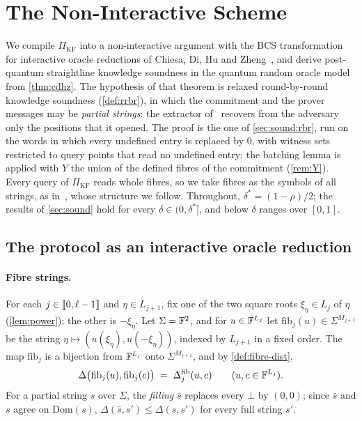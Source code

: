 \section{The Non-Interactive Scheme}\label{sec:pq}

We compile $\Pi_{\mathrm{KF}}$ into a non-interactive argument with the BCS transformation for interactive oracle reductions of Chiesa, Di, Hu and Zheng~\cite{CDHZ25}, and derive post-quantum straightline knowledge soundness in the quantum random oracle model from \cref{thm:cdhz}.
The hypothesis of that theorem is relaxed round-by-round knowledge soundness (\cref{def:rrbr}), in which the commitment and the prover messages may be \emph{partial strings}: the extractor of~\cite{CDHZ25} recovers from the adversary only the positions that it opened.
The proof is the one of \cref{sec:sound:rbr}, run on the words in which every undefined entry is replaced by $0$, with witness sets restricted to query points that read no undefined entry; the batching lemma is applied with $Y$ the union of the defined fibres of the commitment (\cref{rem:Y}).
Every query of $\Pi_{\mathrm{KF}}$ reads whole fibres, so we take fibres as the symbols of all strings, as in~\cite[\S7.7]{Mkh26}, whose structure we follow.
Throughout, $\delta^* = (1-\rho)/2$; the results of \cref{sec:sound} hold for every $\delta \in (0,\delta^*]$, and below $\delta$ ranges over $[0,1]$.

\subsection{The protocol as an interactive oracle reduction}\label{sec:pq:ior}

\paragraph{Fibre strings.}
For each $j \in \llbracket 0, \ell-1 \rrbracket$ and $\eta \in L_{j+1}$, fix one of the two square roots $\xi_\eta \in L_j$ of $\eta$ (\cref{lem:power}); the other is $-\xi_\eta$.
Let $\Sigma = \mathbb{F}^2$, and for $u \in \mathbb{F}^{L_j}$ let $\mathrm{fib}_j(u) \in \Sigma^{M_{j+1}}$ be the string $\eta \mapsto (u(\xi_\eta), u(-\xi_\eta))$, indexed by $L_{j+1}$ in a fixed order.
The map $\mathrm{fib}_j$ is a bijection from $\mathbb{F}^{L_j}$ onto $\Sigma^{M_{j+1}}$, and by \cref{def:fibre-dist},
\begin{equation}\label{eq:fib-hamming}
  \Delta\bigl(\mathrm{fib}_j(u), \mathrm{fib}_j(c)\bigr) \;=\; \Delta^{\mathrm{fib}}_j(u, c) \qquad (u, c \in \mathbb{F}^{L_j}).
\end{equation}
For a partial string $s$ over $\Sigma$, the \emph{filling} $\bar s$ replaces every $\bot$ by $(0,0)$; since $\bar s$ and $s$ agree on $\mathrm{Dom}(s)$, $\Delta(\bar s, s') \le \Delta(s, s')$ for every full string $s'$.

